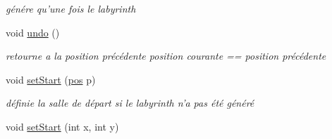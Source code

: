 \begin{DoxyCompactItemize}
\begin{DoxyCompactList}\small\item\em génére qu'une fois le labyrinth \end{DoxyCompactList}\item 
\hypertarget{class_labyrinth_aa6bbe37a3dae3799c0557c8c92a88f06}{void \hyperlink{class_labyrinth_aa6bbe37a3dae3799c0557c8c92a88f06}{undo} ()}\label{class_labyrinth_aa6bbe37a3dae3799c0557c8c92a88f06}

\begin{DoxyCompactList}\small\item\em retourne a la position précédente position courante == position précédente \end{DoxyCompactList}\item 
void \hyperlink{class_labyrinth_a85ffc879951c809634eb07cffbf5cfd1}{set\-Start} (\hyperlink{structpos}{pos} p)
\begin{DoxyCompactList}\small\item\em définie la salle de départ si le labyrinth n'a pas été généré \end{DoxyCompactList}\item 
void \hyperlink{class_labyrinth_a3693e9bea996fc9083b880ab69cce138}{set\-Start} (int x, int y)
\end{DoxyCompactItemize}
